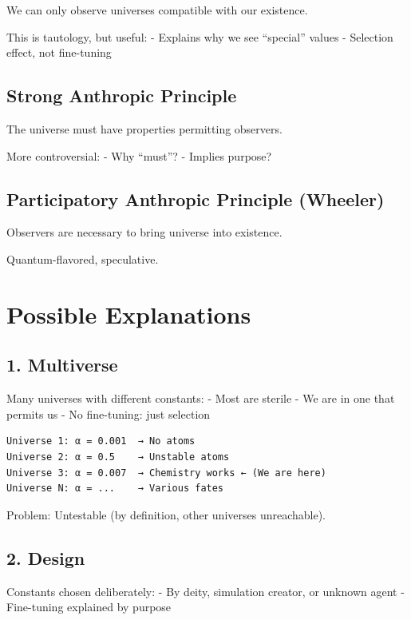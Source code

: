 \documentclass[
  11pt,
  letterpaper,
  twoside,
  openright]{book}
\begin{document}
We can only observe universes compatible with our existence.

This is tautology, but useful: - Explains why we see ``special'' values
- Selection effect, not fine-tuning

\subsection{Strong Anthropic
Principle}\label{strong-anthropic-principle}

The universe must have properties permitting observers.

More controversial: - Why ``must''? - Implies purpose?

\subsection{Participatory Anthropic Principle
(Wheeler)}\label{participatory-anthropic-principle-wheeler}

Observers are necessary to bring universe into existence.

Quantum-flavored, speculative.

\section{Possible Explanations}\label{possible-explanations}

\subsection{1. Multiverse}\label{multiverse}

Many universes with different constants: - Most are sterile - We are in
one that permits us - No fine-tuning: just selection

\begin{verbatim}
Universe 1: α = 0.001  → No atoms
Universe 2: α = 0.5    → Unstable atoms
Universe 3: α = 0.007  → Chemistry works ← (We are here)
Universe N: α = ...    → Various fates
\end{verbatim}

Problem: Untestable (by definition, other universes unreachable).

\subsection{2. Design}\label{design}

Constants chosen deliberately: - By deity, simulation creator, or
unknown agent - Fine-tuning explained by purpose
\end{document}
